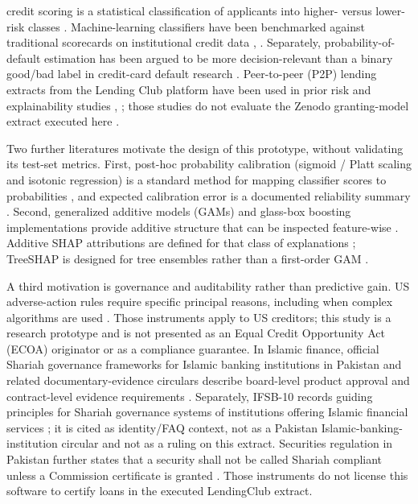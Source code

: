 \documentclass{ieeeaccess}
\begin{document}
 credit scoring is a statistical classification of applicants into higher- versus lower-risk classes \cite{b1}. Machine-learning classifiers have been benchmarked against traditional scorecards on institutional credit data \cite{b2}, \cite{b3}. Separately, probability-of-default estimation has been argued to be more decision-relevant than a binary good/bad label in credit-card default research \cite{b4}. Peer-to-peer (P2P) lending extracts from the Lending Club platform have been used in prior risk and explainability studies \cite{b5}, \cite{b6}; those studies do not evaluate the Zenodo granting-model extract executed here \cite{b20}.

Two further literatures motivate the design of this prototype, without validating its test-set metrics. First, post-hoc probability calibration (sigmoid / Platt scaling and isotonic regression) is a standard method for mapping classifier scores to probabilities \cite{b14,b15,b16}, and expected calibration error is a documented reliability summary \cite{b17}. Second, generalized additive models (GAMs) and glass-box boosting implementations provide additive structure that can be inspected feature-wise \cite{b9,b10,b11}. Additive SHAP attributions are defined for that class of explanations \cite{b12}; TreeSHAP is designed for tree ensembles rather than a first-order GAM \cite{b13}.

A third motivation is governance and auditability rather than predictive gain. US adverse-action rules require specific principal reasons, including when complex algorithms are used \cite{b32,b33,b34}. Those instruments apply to US creditors; this study is a research prototype and is not presented as an Equal Credit Opportunity Act (ECOA) originator or as a compliance guarantee. In Islamic finance, official Shariah governance frameworks for Islamic banking institutions in Pakistan and related documentary-evidence circulars describe board-level product approval and contract-level evidence requirements \cite{b24,b25,b26}. Separately, IFSB-10 records guiding principles for Shariah governance systems of institutions offering Islamic financial services \cite{b31}; it is cited as identity/FAQ context, not as a Pakistan Islamic-banking-institution circular and not as a ruling on this extract. Securities regulation in Pakistan further states that a security shall not be called Shariah compliant unless a Commission certificate is granted \cite{b27}. Those instruments do not license this software to certify loans in the executed LendingClub extract.
\end{document}
